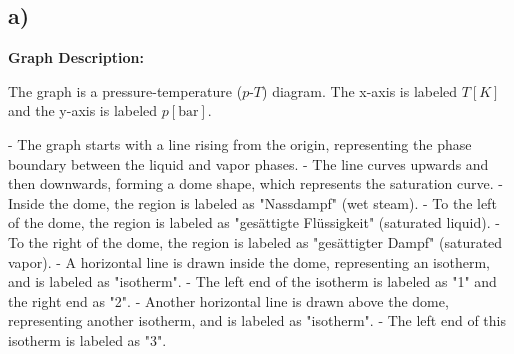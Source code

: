 

\subsection*{a)}

\begin{center}
\textbf{Graph Description:}

The graph is a pressure-temperature ($p$-$T$) diagram. The x-axis is labeled $T [K]$ and the y-axis is labeled $p [\text{bar}]$. 

- The graph starts with a line rising from the origin, representing the phase boundary between the liquid and vapor phases.
- The line curves upwards and then downwards, forming a dome shape, which represents the saturation curve.
- Inside the dome, the region is labeled as "Nassdampf" (wet steam).
- To the left of the dome, the region is labeled as "gesättigte Flüssigkeit" (saturated liquid).
- To the right of the dome, the region is labeled as "gesättigter Dampf" (saturated vapor).
- A horizontal line is drawn inside the dome, representing an isotherm, and is labeled as "isotherm".
- The left end of the isotherm is labeled as "1" and the right end as "2".
- Another horizontal line is drawn above the dome, representing another isotherm, and is labeled as "isotherm".
- The left end of this isotherm is labeled as "3".

\end{center}